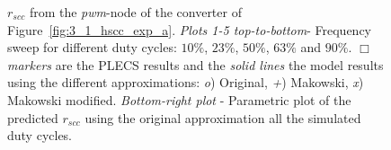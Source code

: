 \begin{figure}[!h]
\centering
    \begin{subfigure}{0.45\textwidth}
        
    \end{subfigure}
    \hfill
    \begin{subfigure}{0.45\textwidth}
        
    \end{subfigure}

    \begin{subfigure}{0.45\textwidth}
        
    \end{subfigure}
    \hfill
    \begin{subfigure}{0.45\textwidth}
        
    \end{subfigure}

        \begin{subfigure}{0.45\textwidth}
        
    \end{subfigure}
    \hfill
    \begin{subfigure}{0.45\textwidth}
        
    \end{subfigure}

\caption{ $r_{scc}$ from the \emph{pwm}-node of the converter of Figure~\ref{fig:3_1_hscc_exp_a}. \emph{Plots 1-5 top-to-bottom}- Frequency sweep for different duty cycles: $10\%$, $23\%$, $50\%$, $63\%$ and $90\%$. \emph{$\Box$ markers} are the PLECS results and the \emph{solid lines} the model results using the different approximations: \emph{o}) Original, \emph{+}) Makowski, \emph{x})  Makowski modified. \emph{Bottom-right plot} - Parametric plot of the predicted $r_{scc}$ using the original approximation all the simulated duty cycles.}
\label{fig:exp_rscc_pwm_node_fsw}
\end{figure}

\clearpage
